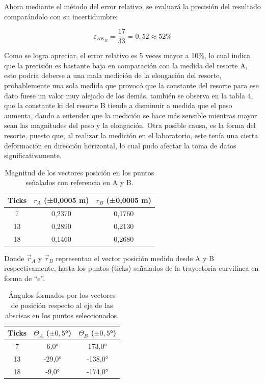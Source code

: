 \documentclass[../main.tex]{subfiles}
\begin{document}
Ahora mediante el método del error relativo, se evaluará la precisión del resultado comparándolo con su incertidumbre:

\[\varepsilon_{RK_B}=\frac{17}{33}=0,52\approx52\%\]

Como se logra apreciar, el error relativo es 5 veces mayor a 10\%,
lo cual indica que la precisión es bastante baja en comparación con la
medida del resorte A, esto podría deberse a una mala medición de la elongación
del resorte, probablemente una sola medida que provocó que la constante del 
resorte para ese dato fuese un valor muy alejado de los demás, también se observa
en la tabla 4, que la constante ki del resorte B tiende a disminuir a medida que 
el peso aumenta, dando a entender que la medición se hace más sensible mientras mayor 
sean las magnitudes del peso y la elongación. Otra posible causa, es la forma del resorte,
puesto que, al realizar la medición en el laboratorio, este tenía una cierta deformación 
en dirección horizontal, lo cual pudo afectar la toma de datos significativamente.

\begin{table}[H]
    \centering
    \begin{tabular}{c|c|c}
        \hline
        Ticks &	$r_A$ (±0,0005 m) & $r_B$ (±0,0005 m) \\
        \hline
        7	& 0,2370	& 0,1760\\
        13	& 0,2890	& 0,2130\\
        18	& 0,1460	& 0,2680\\
        \hline
    \end{tabular}
    \label{ref:tab5}
    \caption{Magnitud de los vectores posición en los puntos señalados con referencia en A y B.}
\end{table}

Donde $\vec{r}_A$ y $\vec{r}_B$ representan el vector posición medido desde A y B
respectivamente, hasta los puntos (ticks) señalados de la trayectoria curvilínea en
forma de “e”.

\begin{table}[H]
    \centering
    \begin{tabular}{c|c|c}
        \hline
        Ticks	& $\Theta_A$  ($\pm 0,5$°) &$\Theta_B$ ($\pm 0,5$°)\\
        \hline
        7	& 6,0°	    & 173,0°\\
        13	& -29,0°	&-138,0°\\
        18	& -9,0° &	-174,0°\\
        \hline
    \end{tabular}
    \label{ref:tab6}
    \caption{Ángulos formados por los vectores de posición respecto al eje de las abscisas en los puntos seleccionados.}
\end{table}
\end{document}
